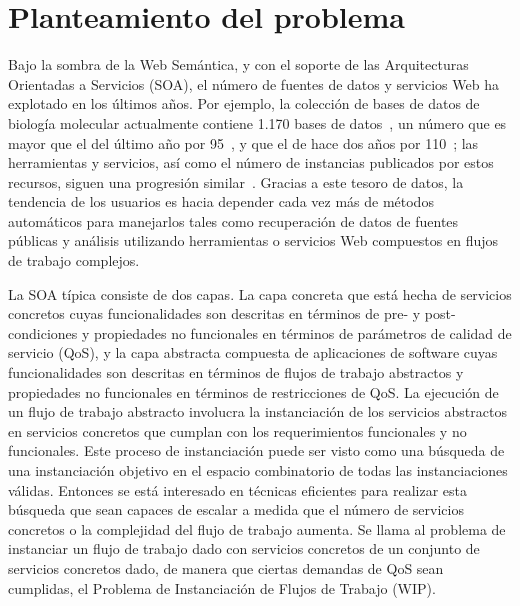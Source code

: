 \section{Planteamiento del problema}

Bajo la sombra de la Web Semántica, y con el soporte de las Arquitecturas Orientadas a
Servicios (SOA), el número de fuentes de datos y servicios Web ha explotado en
los últimos años. Por ejemplo, la colección de bases de datos de biología
molecular actualmente contiene 1.170 bases de datos~\cite{Galperin09}, un número
que es
mayor que el del último año por 95~\cite{Galperin2008}, y que el de hace dos
años por 110~\cite{Galperin2007};
las herramientas y servicios, así como el número de instancias
publicados por estos recursos, siguen una progresión similar~\cite{Benson07}.
Gracias a
este tesoro de datos, la tendencia de los usuarios es hacia depender cada vez
más de métodos automáticos para manejarlos tales como recuperación de datos de
fuentes públicas y análisis utilizando herramientas o servicios Web compuestos
en flujos de trabajo complejos.

La SOA típica consiste de dos capas. La capa concreta que está hecha de
servicios concretos cuyas funcionalidades son descritas en términos de pre- y
post-condiciones y propiedades no funcionales en términos de parámetros de
calidad de servicio (QoS), y
la capa abstracta compuesta de aplicaciones de software cuyas funcionalidades
son descritas en términos de flujos de trabajo abstractos y propiedades no
funcionales en términos de restricciones de QoS. La ejecución de un flujo de
trabajo abstracto involucra la instanciación de los servicios abstractos en
servicios concretos que cumplan con los requerimientos funcionales y no
funcionales. Este proceso de instanciación puede ser visto como una búsqueda de
una instanciación objetivo en el espacio combinatorio de todas las
instanciaciones válidas. Entonces se está interesado en técnicas eficientes para
realizar esta búsqueda que sean capaces de escalar a medida que el número de
servicios concretos o la complejidad del flujo de trabajo aumenta. Se llama al
problema de instanciar un flujo de trabajo dado con servicios concretos de un
conjunto de servicios concretos dado, de manera que ciertas demandas de QoS sean
cumplidas, el Problema de Instanciación de Flujos de Trabajo (WIP).

